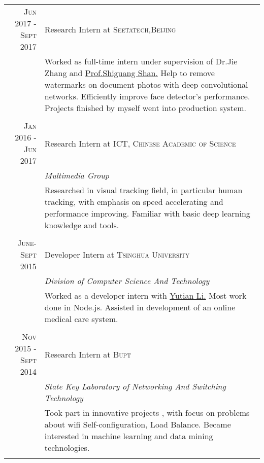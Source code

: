 \documentclass[a4paper,10pt]{article}
\begin{document}
\begin{tabular}{r|p{11cm}}

 \textsc{Jun 2017 - Sept 2017} & Research Intern at \textsc{Seetatech,Beijing} \\&\footnotesize{Worked as full-time intern under supervision of Dr.Jie Zhang and} \href{http://www.jdl.ac.cn/user/sgshan/index_en.htm}{Prof.Shiguang Shan.} \footnotesize{Help to remove watermarks on document photos with deep convolutional networks. Efficiently improve face detector's performance. Projects finished by myself went into production system.}\\\multicolumn{2}{c}{} \\

 \textsc{Jan 2016 - Jun 2017} & Research Intern at \textsc{ICT, Chinese Academic of Science} \\&\emph{Multimedia Group}\\&\footnotesize{Researched in visual tracking field, in particular human tracking, with emphasis on speed accelerating and performance improving. Familiar with basic deep learning knowledge and tools.}\\\multicolumn{2}{c}{} \\
 \textsc{June-Sept 2015} & Developer Intern at \textsc{Tsinghua University}  \\&\emph{Division of Computer Science And Technology}\\& \footnotesize{Worked as a developer intern with }\href{https://yutian.li/}{Yutian Li.} \footnotesize{Most work done in Node.js. Assisted in development of an online medical care system.}\\\multicolumn{2}{c}{} \\
 \textsc{Nov 2015 - Sept 2014} & Research Intern at \textsc{Bupt}  \\&\emph{State Key Laboratory of Networking And Switching Technology}\\&\footnotesize{Took part in innovative projects , with focus on problems about wifi Self-configuration, Load Balance. Became interested in machine learning and data mining technologies.}\\\multicolumn{2}{c}{} \\
\end{tabular}
\end{document}
